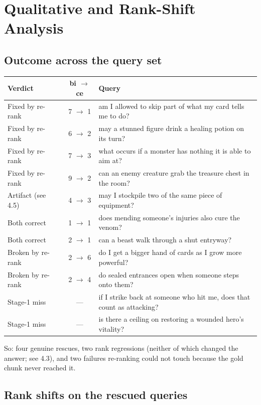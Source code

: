 \documentclass[11pt,a4paper]{article}
\begin{document}
\section{Qualitative and Rank-Shift Analysis}

\subsection{Outcome across the query set}

\begin{tabular}{llcl}
\toprule
Verdict & & bi $\rightarrow$ ce & Query \\
\midrule
Fixed by re-rank    && 7 $\rightarrow$ 1 & am I allowed to skip part of what my card tells me to do? \\
Fixed by re-rank    && 6 $\rightarrow$ 2 & may a stunned figure drink a healing potion on its turn? \\
Fixed by re-rank    && 7 $\rightarrow$ 3 & what occurs if a monster has nothing it is able to aim at? \\
Fixed by re-rank    && 9 $\rightarrow$ 2 & can an enemy creature grab the treasure chest in the room? \\
Artifact (see 4.5)  && 4 $\rightarrow$ 3 & may I stockpile two of the same piece of equipment? \\
Both correct        && 1 $\rightarrow$ 1 & does mending someone's injuries also cure the venom? \\
Both correct        && 2 $\rightarrow$ 1 & can a beast walk through a shut entryway? \\
Broken by re-rank   && 2 $\rightarrow$ 6 & do I get a bigger hand of cards as I grow more powerful? \\
Broken by re-rank   && 2 $\rightarrow$ 4 & do sealed entrances open when someone steps onto them? \\
Stage-1 miss        && --- & if I strike back at someone who hit me, does that count as attacking? \\
Stage-1 miss        && --- & is there a ceiling on restoring a wounded hero's vitality? \\
\bottomrule
\end{tabular}

\medskip
So: four genuine rescues, two rank regressions (neither of which changed the answer;
see 4.3), and two failures re-ranking could not touch because the gold chunk never reached
it.

\subsection{Rank shifts on the rescued queries}
\end{document}

